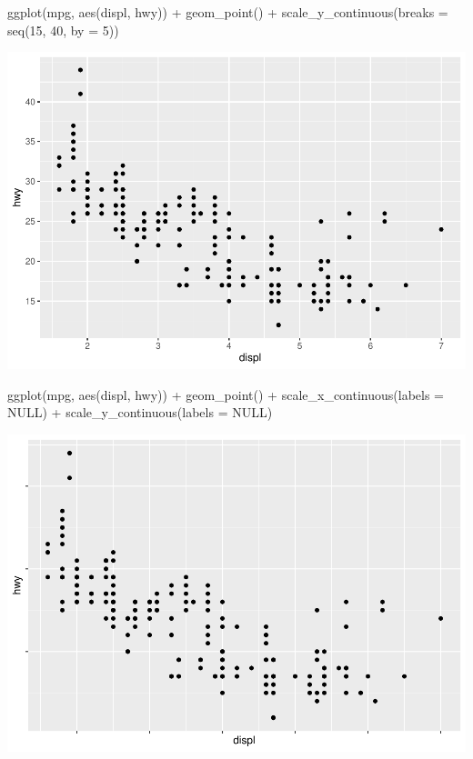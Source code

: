 \documentclass[
]{article}
\newenvironment{Shaded}{\begin{snugshade}}{\end{snugshade}}
\newcommand{\AttributeTok}[1]{\textcolor[rgb]{0.77,0.63,0.00}{#1}}
\newcommand{\ConstantTok}[1]{\textcolor[rgb]{0.00,0.00,0.00}{#1}}
\newcommand{\DecValTok}[1]{\textcolor[rgb]{0.00,0.00,0.81}{#1}}
\newcommand{\FunctionTok}[1]{\textcolor[rgb]{0.00,0.00,0.00}{#1}}
\newcommand{\NormalTok}[1]{#1}
\newcommand{\SpecialCharTok}[1]{\textcolor[rgb]{0.00,0.00,0.00}{#1}}
\begin{document}
\begin{Shaded}
\begin{Highlighting}[]
\FunctionTok{ggplot}\NormalTok{(mpg, }\FunctionTok{aes}\NormalTok{(displ, hwy)) }\SpecialCharTok{+}
  \FunctionTok{geom\_point}\NormalTok{() }\SpecialCharTok{+}
  \FunctionTok{scale\_y\_continuous}\NormalTok{(}\AttributeTok{breaks =} \FunctionTok{seq}\NormalTok{(}\DecValTok{15}\NormalTok{, }\DecValTok{40}\NormalTok{, }\AttributeTok{by =} \DecValTok{5}\NormalTok{))}
\end{Highlighting}
\end{Shaded}

\includegraphics{Journal_files/figure-latex/unnamed-chunk-60-3.pdf}

\begin{Shaded}
\begin{Highlighting}[]
\FunctionTok{ggplot}\NormalTok{(mpg, }\FunctionTok{aes}\NormalTok{(displ, hwy)) }\SpecialCharTok{+}
  \FunctionTok{geom\_point}\NormalTok{() }\SpecialCharTok{+}
  \FunctionTok{scale\_x\_continuous}\NormalTok{(}\AttributeTok{labels =} \ConstantTok{NULL}\NormalTok{) }\SpecialCharTok{+}
  \FunctionTok{scale\_y\_continuous}\NormalTok{(}\AttributeTok{labels =} \ConstantTok{NULL}\NormalTok{)}
\end{Highlighting}
\end{Shaded}

\includegraphics{Journal_files/figure-latex/unnamed-chunk-60-4.pdf}
\end{document}
